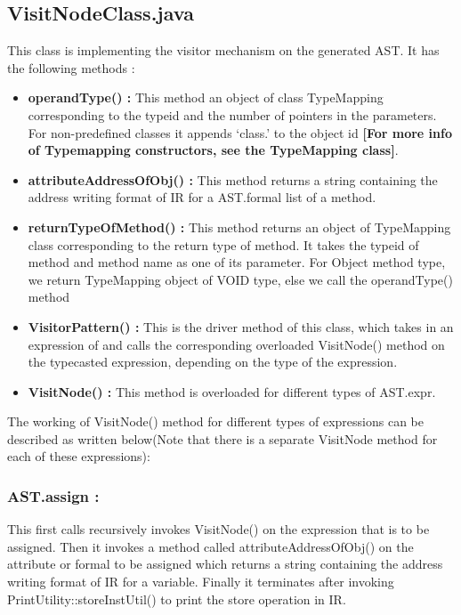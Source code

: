 \documentclass{article}
\begin{document}
\subsection{VisitNodeClass.java}
This class is implementing the visitor mechanism on the generated AST. It has the following methods : 
\begin{itemize}

    \item \textbf{operandType() :} This method an object of class TypeMapping corresponding to the typeid and the number of pointers in the parameters. For non-predefined classes it appends ‘class.’ to the object id \textbf{[For more info of Typemapping constructors, see the TypeMapping class]}.
    \item \textbf{attributeAddressOfObj() :} This method returns a string containing the address writing format of IR for a AST.formal list of a method.
    \item \textbf{returnTypeOfMethod() :} This method returns an object of TypeMapping class corresponding to the return type of method. It takes the typeid of method and method name as one of its parameter. For Object method type, we return TypeMapping object of VOID type, else we call the operandType() method
    \item \textbf{VisitorPattern() :} This is the driver method of this class, which takes in an expression of and calls the corresponding overloaded VisitNode() method on the typecasted expression, depending on the type of the expression.
    \item \textbf{VisitNode() :} This method is overloaded for different types of AST.expr. 
   
\end{itemize}

The working of VisitNode() method for different types of expressions can be described as written below(Note that there is a separate VisitNode method for each of these expressions):
\subsubsection{AST.assign :}
This first calls recursively invokes VisitNode() on the expression that is to be assigned. Then it invokes a method called attributeAddressOfObj() on the attribute or formal to be assigned which returns a string containing the address writing format of IR for a variable. Finally it terminates after invoking PrintUtility::storeInstUtil() to print the store operation in IR.
\end{document}
